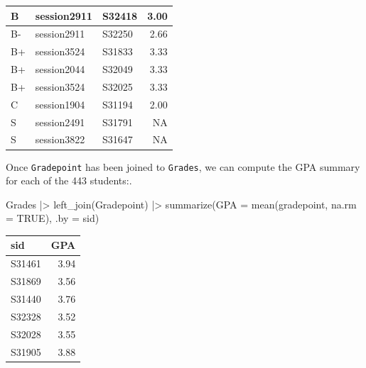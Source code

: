 \documentclass[
  letterpaper,
  DIV=11,
  numbers=noendperiod,
  oneside]{scrartcl}
\newenvironment{Shaded}{\begin{snugshade}}{\end{snugshade}}
\newcommand{\AttributeTok}[1]{\textcolor[rgb]{0.40,0.45,0.13}{#1}}
\newcommand{\ConstantTok}[1]{\textcolor[rgb]{0.56,0.35,0.01}{#1}}
\newcommand{\FunctionTok}[1]{\textcolor[rgb]{0.28,0.35,0.67}{#1}}
\newcommand{\NormalTok}[1]{\textcolor[rgb]{0.00,0.23,0.31}{#1}}
\newcommand{\SpecialCharTok}[1]{\textcolor[rgb]{0.37,0.37,0.37}{#1}}
\begin{document}
\begin{tabular}{l|l|l|r}
\hline
B & session2911 & S32418 & 3.00\\
\hline
B- & session2911 & S32250 & 2.66\\
\hline
B+ & session3524 & S31833 & 3.33\\
\hline
B+ & session2044 & S32049 & 3.33\\
\hline
B+ & session3524 & S32025 & 3.33\\
\hline
C & session1904 & S31194 & 2.00\\
\hline
S & session2491 & S31791 & NA\\
\hline
S & session3822 & S31647 & NA\\
\hline
\end{tabular}

Once \texttt{Gradepoint} has been joined to \texttt{Grades}, we can
compute the GPA summary for each of the 443 students:.

\begin{Shaded}
\begin{Highlighting}[]
\NormalTok{Grades }\SpecialCharTok{|\textgreater{}}
  \FunctionTok{left\_join}\NormalTok{(Gradepoint) }\SpecialCharTok{|\textgreater{}}
  \FunctionTok{summarize}\NormalTok{(}\AttributeTok{GPA =} \FunctionTok{mean}\NormalTok{(gradepoint, }\AttributeTok{na.rm =} \ConstantTok{TRUE}\NormalTok{), }\AttributeTok{.by =}\NormalTok{ sid)}
\end{Highlighting}
\end{Shaded}

{}

\begin{tabular}{l|r}
\hline
sid & GPA\\
\hline
S31461 & 3.94\\
\hline
S31869 & 3.56\\
\hline
S31440 & 3.76\\
\hline
S32328 & 3.52\\
\hline
S32028 & 3.55\\
\hline
S31905 & 3.88\\
\hline
\end{tabular}
\end{document}
